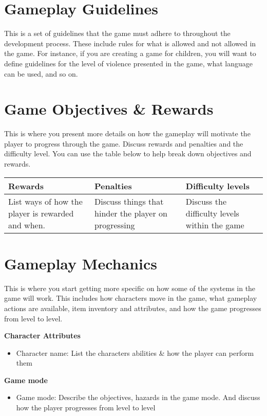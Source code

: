 \documentclass[a4paper, 12pt]{report}
\begin{document}
\section{Gameplay Guidelines}
This is a set of guidelines that the game must adhere to throughout the development process. These include rules for what is allowed and not allowed in the game. For instance, if you are creating a game for children, you will want to define guidelines for the level of violence presented in the game, what language can be used, and so on. 

\section{Game Objectives \& Rewards}
This is where you present more details on how the gameplay will motivate the player to progress through the game. Discuss rewards and penalties and the difficulty level. You can use the table below to help break down objectives and rewards.

\begin{tabular}[h]{p{4 cm}|p{4 cm}|p{4cm}}
    \hline
    Rewards & Penalties & Difficulty levels
     \\
        \hline
         List ways of how the player is rewarded and when. & Discuss things that hinder the player on progressing & Discuss the difficulty levels within the game
     \\
     \hline
\end{tabular}
\vspace{1 cm}

\section{Gameplay Mechanics}
This is where you start getting more specific on how some of the systems in the game will work. This includes how characters move in the game, what gameplay actions are available, item inventory and attributes, and how the game progresses from level to level.

\textbf{Character Attributes}
\begin{itemize}
    \item Character name: List the characters abilities \& how the player can perform them
\end{itemize}

\textbf{Game mode}
\begin{itemize}
    \item Game mode: Describe the objectives, hazards in the game mode. And discuss how the player progresses from level to level
\end{itemize}
\end{document}
